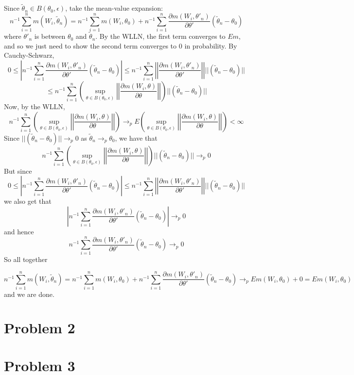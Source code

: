 \documentclass[10pt,letter]{article}
\begin{document}
Since $\tilde{\theta}_n \in B(\theta_0, \epsilon)$, take the mean-value expansion:
\[ n^{-1}\sum_{i=1}^n m(W_i, \tilde{\theta}_n) = n^{-1}\sum_{i=1}^n m(W_i, \theta_0) + n^{-1}\sum_{i=1}^n \frac{\partial m(W_i, \theta'_n)}{\partial \theta'}( \tilde{\theta}_n - \theta_0)  \]
where $\theta'_n$ is between $\theta_0$ and $\tilde{\theta}_n$. By the WLLN, the first term converges to $Em$, and so we just need to show the second term converges to 0 in probability. By Cauchy-Schwarz,
\[ 0 \le \left|n^{-1}\sum_{i=1}^n \frac{\partial m(W_i, \theta'_n)}{\partial \theta'}( \tilde{\theta}_n - \theta_0) \right| \le  n^{-1}\sum_{i=1}^n \left|\left|\frac{\partial m(W_i, \theta'_n)}{\partial \theta'}\right|\right| ||(\tilde{\theta}_n - \theta_0) ||  \]
\[ \le n^{-1}\sum_{i=1}^n \left(\sup_{\theta \in B(\theta_0, \epsilon)} \left|\left|\frac{\partial m(W_i, \theta)}{\partial \theta}\right|\right| \right)||(\tilde{\theta}_n - \theta_0) || \]
Now, by the WLLN,
\[ n^{-1}\sum_{i=1}^n \left(\sup_{\theta \in B(\theta_0, \epsilon)} \left|\left|\frac{\partial m(W_i, \theta)}{\partial \theta}\right|\right| \right) \to_p E\left(\sup_{\theta \in B(\theta_0, \epsilon)} \left|\left|\frac{\partial m(W_i, \theta)}{\partial \theta}\right|\right| \right) < \infty \]
Since $||(\tilde{\theta}_n - \theta_0) || \to_p 0$ as $\tilde{\theta}_n \to_p \theta_0$, we have that
\[ n^{-1}\sum_{i=1}^n \left(\sup_{\theta \in B(\theta_0, \epsilon)} \left|\left|\frac{\partial m(W_i, \theta)}{\partial \theta}\right|\right| \right)||(\tilde{\theta}_n - \theta_0) || \to_p 0 \]
But since
\[ 0 \le \left|n^{-1}\sum_{i=1}^n \frac{\partial m(W_i, \theta'_n)}{\partial \theta'}( \tilde{\theta}_n - \theta_0) \right| \le  n^{-1}\sum_{i=1}^n \left|\left|\frac{\partial m(W_i, \theta'_n)}{\partial \theta'}\right|\right| ||(\tilde{\theta}_n - \theta_0) ||  \]
we also get that
\[\left|n^{-1}\sum_{i=1}^n \frac{\partial m(W_i, \theta'_n)}{\partial \theta'}( \tilde{\theta}_n - \theta_0) \right| \to_p 0 \]
and hence
\[ n^{-1}\sum_{i=1}^n \frac{\partial m(W_i, \theta'_n)}{\partial \theta'}( \tilde{\theta}_n - \theta_0) \to_p 0 \]
So all together

\[ n^{-1}\sum_{i=1}^n m(W_i, \tilde{\theta}_n) = n^{-1}\sum_{i=1}^n m(W_i, \theta_0) + n^{-1}\sum_{i=1}^n \frac{\partial m(W_i, \theta'_n)}{\partial \theta'}( \tilde{\theta}_n - \theta_0) \to_p Em(W_i, \theta_0) + 0 = Em(W_i, \theta_0) \]
and we are done.
\section*{Problem 2}
\section*{Problem 3}
\end{document}
